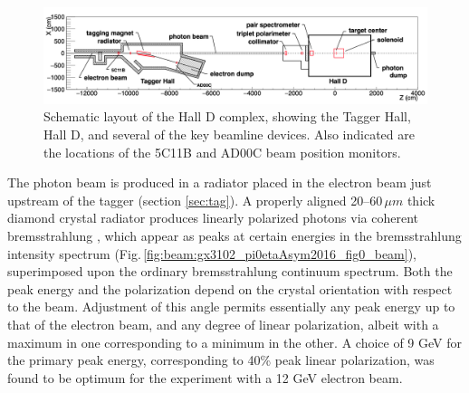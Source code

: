 \begin{figure}[t]
\begin{center}
 \includegraphics[clip=true,width=0.98\linewidth]{figures/Draw_beamline.png}
\end{center}
\caption{Schematic layout of the Hall D complex, showing the Tagger Hall, Hall D, and
several of the key beamline devices.
Also indicated are the locations of the 5C11B and AD00C beam position monitors.
        }
\label{fig:beam:Draw_beamline} 
\end{figure}

The photon beam is produced in a radiator placed in the electron beam just upstream of the
tagger (section \ref{sec:tag}). A properly aligned 20--60\,$\mu m$ thick diamond crystal
radiator produces
linearly polarized photons via coherent brems\-strah\-lung \cite{timm1969,LIVINGSTON2009205},
which appear as peaks at certain energies in the brems\-strah\-lung intensity spectrum (Fig.\,\ref{fig:beam:gx3102_pi0etaAsym2016_fig0_beam}), superimposed upon the ordinary brems\-strah\-lung
continuum spectrum.
Both the peak energy and the polarization depend on the crystal orientation with respect to the beam.
Adjustment of this angle permits essentially any peak energy up to that of the electron beam, and any
degree of linear polarization, albeit with a maximum in one corresponding to a minimum in the other.
A choice of 9 GeV for the primary peak energy, corresponding to 40\% peak linear polarization,
was found to be optimum for the \GX{} experiment with a 12 GeV electron beam.

